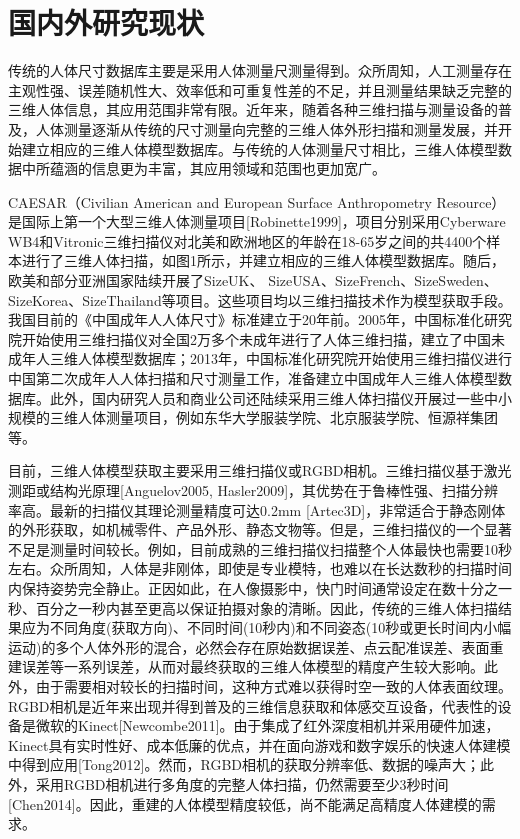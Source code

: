 \documentclass[10pt]{article}
\newcommand{\upcite}[1]{\textsuperscript{\textsuperscript{\cite{#1}}}}
\begin{document}
\section{国内外研究现状}
传统的人体尺寸数据库主要是采用人体测量尺测量得到。众所周知，人工测量存在主观性强、误差随机性大、效率低和可重复性差的不足，并且测量结果缺乏完整的三维人体信息，其应用范围非常有限。近年来，随着各种三维扫描与测量设备的普及，人体测量逐渐从传统的尺寸测量向完整的三维人体外形扫描和测量发展\upcite{measurement1}，并开始建立相应的三维人体模型数据库。与传统的人体测量尺寸相比，三维人体模型数据中所蕴涵的信息更为丰富，其应用领域和范围也更加宽广。
\par CAESAR（Civilian American and European Surface Anthropometry Resource）是国际上第一个大型三维人体测量项目[Robinette1999]，项目分别采用Cyberware WB4和Vitronic三维扫描仪对北美和欧洲地区的年龄在18-65岁之间的共4400个样本进行了三维人体扫描，如图1所示，并建立相应的三维人体模型数据库。随后，欧美和部分亚洲国家陆续开展了SizeUK、 SizeUSA、SizeFrench、SizeSweden、SizeKorea、SizeThailand等项目。这些项目均以三维扫描技术作为模型获取手段。我国目前的《中国成年人人体尺寸》标准建立于20年前。2005年，中国标准化研究院开始使用三维扫描仪对全国2万多个未成年进行了人体三维扫描，建立了中国未成年人三维人体模型数据库；2013年，中国标准化研究院开始使用三维扫描仪进行中国第二次成年人人体扫描和尺寸测量工作，准备建立中国成年人三维人体模型数据库。此外，国内研究人员和商业公司还陆续采用三维人体扫描仪开展过一些中小规模的三维人体测量项目，例如东华大学服装学院、北京服装学院、恒源祥集团等。
\par 目前，三维人体模型获取主要采用三维扫描仪或RGBD相机。三维扫描仪基于激光测距或结构光原理[Anguelov2005, Hasler2009]，其优势在于鲁棒性强、扫描分辨率高。最新的扫描仪其理论测量精度可达0.2mm [Artec3D]，非常适合于静态刚体的外形获取，如机械零件、产品外形、静态文物等。但是，三维扫描仪的一个显著不足是测量时间较长。例如，目前成熟的三维扫描仪扫描整个人体最快也需要10秒左右。众所周知，人体是非刚体，即使是专业模特，也难以在长达数秒的扫描时间内保持姿势完全静止。正因如此，在人像摄影中，快门时间通常设定在数十分之一秒、百分之一秒内甚至更高以保证拍摄对象的清晰。因此，传统的三维人体扫描结果应为不同角度(获取方向)、不同时间(10秒内)和不同姿态(10秒或更长时间内小幅运动)的多个人体外形的混合，必然会存在原始数据误差、点云配准误差、表面重建误差等一系列误差，从而对最终获取的三维人体模型的精度产生较大影响。此外，由于需要相对较长的扫描时间，这种方式难以获得时空一致的人体表面纹理。RGBD相机是近年来出现并得到普及的三维信息获取和体感交互设备，代表性的设备是微软的Kinect[Newcombe2011]。由于集成了红外深度相机并采用硬件加速，Kinect具有实时性好、成本低廉的优点，并在面向游戏和数字娱乐的快速人体建模中得到应用[Tong2012]。然而，RGBD相机的获取分辨率低、数据的噪声大；此外，采用RGBD相机进行多角度的完整人体扫描，仍然需要至少3秒时间[Chen2014]。因此，重建的人体模型精度较低，尚不能满足高精度人体建模的需求。
\end{document}
